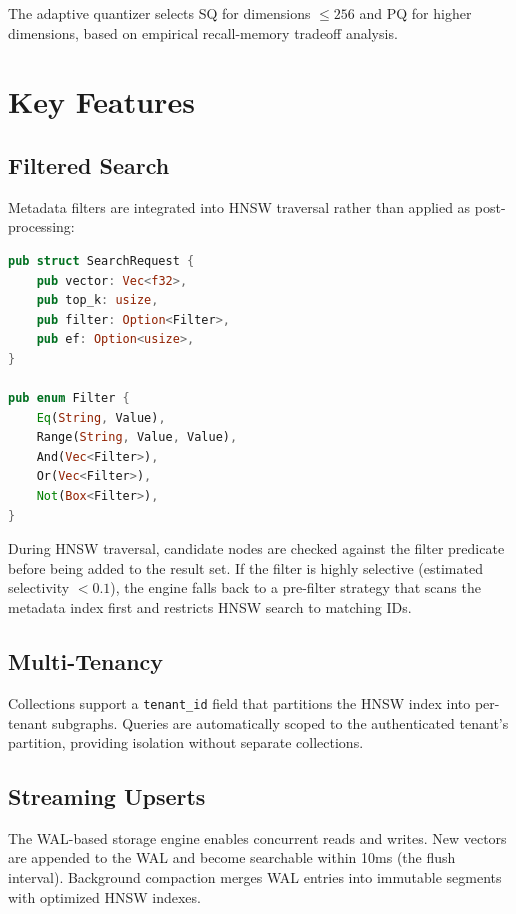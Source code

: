 \documentclass[11pt,twocolumn]{article}
\begin{document}
The adaptive quantizer selects SQ for dimensions $\leq 256$ and PQ for higher dimensions, based on empirical recall-memory tradeoff analysis.

\section{Key Features}

\subsection{Filtered Search}

Metadata filters are integrated into HNSW traversal rather than applied as post-processing:

\begin{lstlisting}[language=Rust]
pub struct SearchRequest {
    pub vector: Vec<f32>,
    pub top_k: usize,
    pub filter: Option<Filter>,
    pub ef: Option<usize>,
}

pub enum Filter {
    Eq(String, Value),
    Range(String, Value, Value),
    And(Vec<Filter>),
    Or(Vec<Filter>),
    Not(Box<Filter>),
}
\end{lstlisting}

During HNSW traversal, candidate nodes are checked against the filter predicate before being added to the result set. If the filter is highly selective (estimated selectivity $< 0.1$), the engine falls back to a pre-filter strategy that scans the metadata index first and restricts HNSW search to matching IDs.

\subsection{Multi-Tenancy}

Collections support a \texttt{tenant\_id} field that partitions the HNSW index into per-tenant subgraphs. Queries are automatically scoped to the authenticated tenant's partition, providing isolation without separate collections.

\subsection{Streaming Upserts}

The WAL-based storage engine enables concurrent reads and writes. New vectors are appended to the WAL and become searchable within 10ms (the flush interval). Background compaction merges WAL entries into immutable segments with optimized HNSW indexes.
\end{document}
